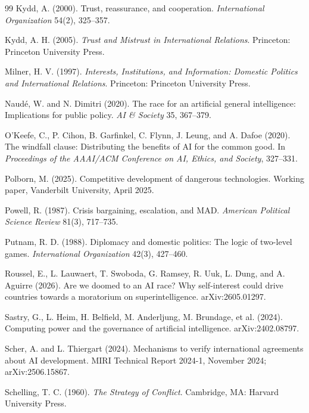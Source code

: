\documentclass[11pt]{article}
\theoremstyle{plain}
\theoremstyle{definition}
\theoremstyle{remark}
\begin{document}
\begin{thebibliography}{99}
 Kydd, A. (2000). Trust, reassurance, and cooperation. \emph{International Organization} 54(2), 325--357.

 Kydd, A. H. (2005). \emph{Trust and Mistrust in International Relations}. Princeton: Princeton University Press.

 Milner, H. V. (1997). \emph{Interests, Institutions, and Information: Domestic Politics and International Relations}. Princeton: Princeton University Press.

 Naud\'e, W. and N. Dimitri (2020). The race for an artificial general intelligence: Implications for public policy. \emph{AI \& Society} 35, 367--379.

 O'Keefe, C., P. Cihon, B. Garfinkel, C. Flynn, J. Leung, and A. Dafoe (2020). The windfall clause: Distributing the benefits of AI for the common good. In \emph{Proceedings of the AAAI/ACM Conference on AI, Ethics, and Society}, 327--331.

 Polborn, M. (2025). Competitive development of dangerous technologies. Working paper, Vanderbilt University, April 2025.

 Powell, R. (1987). Crisis bargaining, escalation, and MAD. \emph{American Political Science Review} 81(3), 717--735.

 Putnam, R. D. (1988). Diplomacy and domestic politics: The logic of two-level games. \emph{International Organization} 42(3), 427--460.

 Roussel, E., L. Lauwaert, T. Swoboda, G. Ramsey, R. Uuk, L. Dung, and A. Aguirre (2026). Are we doomed to an AI race? Why self-interest could drive countries towards a moratorium on superintelligence. arXiv:2605.01297.

 Sastry, G., L. Heim, H. Belfield, M. Anderljung, M. Brundage, et al. (2024). Computing power and the governance of artificial intelligence. arXiv:2402.08797.

 Scher, A. and L. Thiergart (2024). Mechanisms to verify international agreements about AI development. MIRI Technical Report 2024-1, November 2024; arXiv:2506.15867.

 Schelling, T. C. (1960). \emph{The Strategy of Conflict}. Cambridge, MA: Harvard University Press.


\end{thebibliography}
\end{document}
